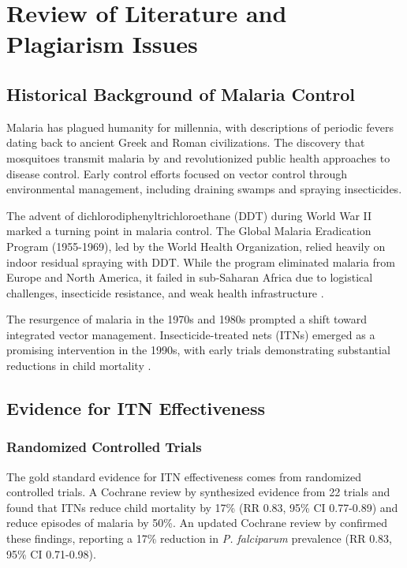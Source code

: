 \chapter{Review of Literature and Plagiarism Issues}

\section{Historical Background of Malaria Control}

Malaria has plagued humanity for millennia, with descriptions of periodic fevers dating back to ancient Greek and Roman civilizations. The discovery that mosquitoes transmit malaria by \citet{ross1897} and \citet{grassi1900} revolutionized public health approaches to disease control. Early control efforts focused on vector control through environmental management, including draining swamps and spraying insecticides.

The advent of dichlorodiphenyltrichloroethane (DDT) during World War II marked a turning point in malaria control. The Global Malaria Eradication Program (1955-1969), led by the World Health Organization, relied heavily on indoor residual spraying with DDT. While the program eliminated malaria from Europe and North America, it failed in sub-Saharan Africa due to logistical challenges, insecticide resistance, and weak health infrastructure \citep{who2023malaria}.

The resurgence of malaria in the 1970s and 1980s prompted a shift toward integrated vector management. Insecticide-treated nets (ITNs) emerged as a promising intervention in the 1990s, with early trials demonstrating substantial reductions in child mortality \citep{lengeler2004insecticide}.

\section{Evidence for ITN Effectiveness}

\subsection{Randomized Controlled Trials}

The gold standard evidence for ITN effectiveness comes from randomized controlled trials. A Cochrane review by \citet{lengeler2004insecticide} synthesized evidence from 22 trials and found that ITNs reduce child mortality by 17\% (RR 0.83, 95\% CI 0.77-0.89) and reduce episodes of malaria by 50\%. An updated Cochrane review by \citet{pryce2018insecticide} confirmed these findings, reporting a 17\% reduction in \textit{P. falciparum} prevalence (RR 0.83, 95\% CI 0.71-0.98).

